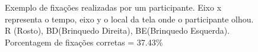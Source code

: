 \documentclass{article}
\begin{document}
\begin{figure}[t]
\caption{Exemplo de fixações realizadas por um participante. Eixo x representa o tempo, eixo y o local da tela onde o participante olhou. R (Rosto), BD(Brinquedo Direita), BE(Brinquedo Esquerda). Porcentagem de fixações corretas = 37.43\%}
\noindent{}
\centering
\end{figure}
\end{document}
